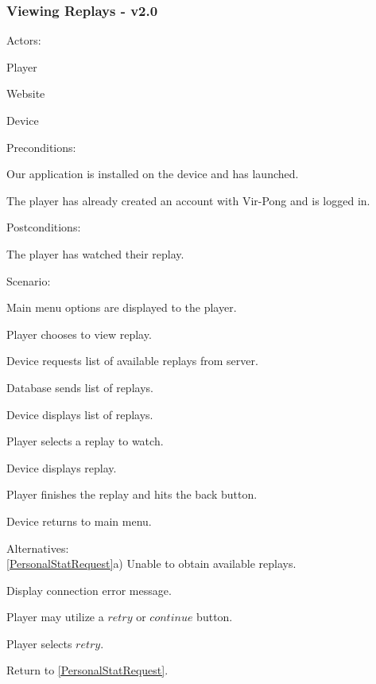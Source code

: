 \documentclass[12pt]{article}
\newenvironment{itemize*}%
  {\begin{itemize}%
  	\setlength{\parsep}{0pt}
    \setlength{\itemsep}{0pt}%
    \setlength{\parskip}{0pt}}%
  {\end{itemize}}
\newenvironment{enumerate*}%
  {\begin{enumerate}%
  	\setlength{\parsep}{0pt}
    \setlength{\itemsep}{0pt}%
    \setlength{\parskip}{0pt}}%
  {\end{enumerate}}
\begin{document}
\subsubsection*{Viewing Replays - v2.0}
Actors:
\begin{itemize*}
\item Player
\item Website
\item Device
\end{itemize*}
Preconditions:
\begin{itemize*}
\item Our application is installed on the device and has launched.
\item The player has already created an account with Vir-Pong and is logged
  in.
\end{itemize*}
Postconditions:
\begin{itemize*}
\item The player has watched their replay.
\end{itemize*}
Scenario:
\begin{enumerate*}
\item Main menu options are displayed to the player.
\item \label{SelectReplay}Player chooses to view replay.
\item \label{ReplayChoice}Device requests list of available replays from server.
\item Database sends list of replays.
\item Device displays list of replays.
\item \label{WatchReplay}Player selects a replay to watch.
\item Device displays replay.
\item \label{Back}Player finishes the replay and hits the back button.
\item Device returns to main menu.
\end{enumerate*}
Alternatives:\\
\ref{PersonalStatRequest}a) Unable to obtain available replays.
\begin{enumerate*}
\item Display connection error message.
\item Player may utilize a $retry$ or $continue$ button.
\item Player selects $retry$.
\item Return to \ref{PersonalStatRequest}.
\end{enumerate*}
\end{document}
